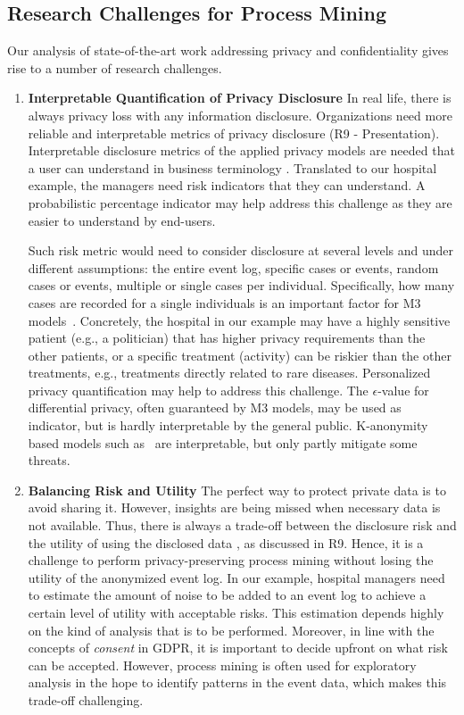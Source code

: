 \documentclass[manuscript]{acmart}
\begin{document}
\subsection{Research Challenges for Process Mining}
Our analysis of state-of-the-art work addressing privacy and confidentiality gives rise to a number of research challenges.

\begin{enumerate}
\item \textbf{Interpretable Quantification of Privacy Disclosure}
In real life, there is always privacy loss with any information disclosure. Organizations need more reliable and interpretable metrics of privacy disclosure (R9 - Presentation). Interpretable disclosure metrics of the applied privacy models are needed that a user can understand in business terminology \cite{wagner2018technical}. Translated to our hospital example, the managers need risk indicators that they can understand. A probabilistic percentage indicator may help address this challenge as they are easier to understand by end-users.

Such risk metric would need to consider disclosure at several levels and under different assumptions: the entire event log, specific cases or events, random cases or events, multiple or single cases per individual. Specifically, how many cases are recorded for a single individuals is an important factor for M3 models~\cite{DBLP:journals/tmis/KartalLL19}. Concretely, the hospital in our example may have a highly sensitive patient (e.g., a politician) that has higher privacy requirements than the other patients, or a specific treatment (activity) can be riskier than the other treatments, e.g., treatments directly related to rare diseases. Personalized privacy quantification may help to address this challenge. The $\epsilon$-value for differential privacy, often guaranteed by M3 models, may be used as indicator, but is hardly interpretable by the general public. K-anonymity based models such as~\cite{rafiei2020tlkc} are interpretable, but only partly mitigate some threats.

\item \textbf{Balancing Risk and Utility}
The perfect way to protect private data is to avoid sharing it. However, insights are being missed when necessary data is not available. Thus, there is always a trade-off between the disclosure risk and the utility of using the disclosed data \cite{lee2011much,hsu2014differential}, as discussed in R9. Hence, it is a challenge to perform privacy-preserving process mining without losing the utility of the anonymized event log. In our example, hospital managers need to estimate the amount of noise to be added to an event log to achieve a certain level of utility with acceptable risks. This estimation depends highly on the kind of analysis that is to be performed. Moreover, in line with the concepts of \emph{consent} in GDPR, it is important to decide upfront on what risk can be accepted. However, process mining is often used for exploratory analysis in the hope to identify patterns in the event data, which makes this trade-off challenging. 


\end{enumerate}
\end{document}

